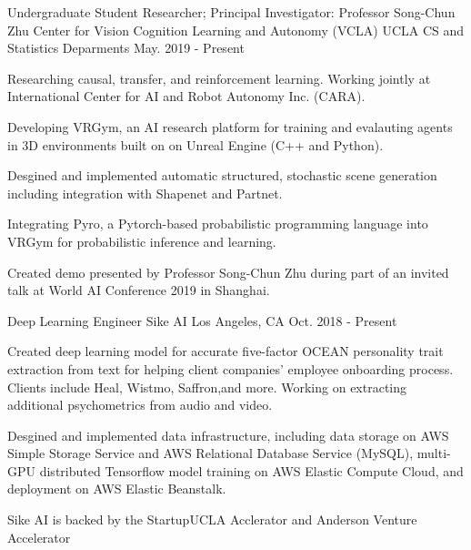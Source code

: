 

\begin{cventries}

  \cventry
    {Undergraduate Student Researcher; Principal Investigator: Professor Song-Chun Zhu} %
    {Center for Vision Cognition Learning and Autonomy (VCLA)} %
    {UCLA CS and Statistics Deparments} %
    {May. 2019 - Present} %
    {
      \begin{cvitems} %
        \item {Researching causal, transfer, and reinforcement learning. Working jointly at International Center for AI and Robot Autonomy Inc. (CARA).}
        \item {Developing VRGym, an AI research platform for training and evalauting agents in
        3D environments built on on Unreal Engine (C++ and Python). } 
        \item {Desgined and implemented automatic structured, stochastic scene generation including integration with Shapenet and Partnet.}
        \item {Integrating Pyro, a Pytorch-based probabilistic programming language into VRGym for probabilistic inference and learning.}
        \item {Created demo presented by Professor Song-Chun Zhu during part of an invited talk at World AI Conference 2019 in Shanghai.}
      \end{cvitems}
    }

  \cventry
    {Deep Learning Engineer} %
    {Sike AI } %
    {Los Angeles, CA} %
    {Oct. 2018 - Present} %
    {
      \begin{cvitems} %
        \item {Created deep learning model for accurate five-factor OCEAN personality trait extraction from text for helping 
        client companies' employee onboarding process. Clients include Heal, Wistmo, Saffron,and more.
        Working on extracting additional psychometrics from audio and video.}
        \item {Desgined and implemented data infrastructure, including data storage on AWS Simple Storage Service
         and AWS Relational Database Service (MySQL), multi-GPU distributed Tensorflow 
         model training on AWS Elastic Compute Cloud, and deployment on AWS Elastic Beanstalk.}
        \item {Sike AI is backed by the StartupUCLA Acclerator and Anderson Venture Accelerator}
      \end{cvitems}
    }


\end{cventries}
